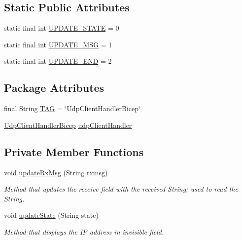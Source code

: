 \subsection*{Static Public Attributes}
\begin{DoxyCompactItemize}
\item 
static final int \mbox{\hyperlink{classcom_1_1example_1_1trainawearapplication_1_1_udp_client_handler_bicep_aac92af19ef7bcdbebc31e78e1822bf61}{U\+P\+D\+A\+T\+E\+\_\+\+S\+T\+A\+TE}} = 0
\item 
static final int \mbox{\hyperlink{classcom_1_1example_1_1trainawearapplication_1_1_udp_client_handler_bicep_a4b12d585b9f99f7364e4295fd18e494e}{U\+P\+D\+A\+T\+E\+\_\+\+M\+SG}} = 1
\item 
static final int \mbox{\hyperlink{classcom_1_1example_1_1trainawearapplication_1_1_udp_client_handler_bicep_a70806fb9d5d3e9626218321b083d9b36}{U\+P\+D\+A\+T\+E\+\_\+\+E\+ND}} = 2
\end{DoxyCompactItemize}
\subsection*{Package Attributes}
\begin{DoxyCompactItemize}
\item 
final String \mbox{\hyperlink{classcom_1_1example_1_1trainawearapplication_1_1_udp_client_handler_bicep_a0eebcd2513478eb3a56f866eaff07fa2}{T\+AG}} = \char`\"{}Udp\+Client\+Handler\+Bicep\char`\"{}
\item 
\mbox{\hyperlink{classcom_1_1example_1_1trainawearapplication_1_1_udp_client_handler_bicep}{Udp\+Client\+Handler\+Bicep}} \mbox{\hyperlink{classcom_1_1example_1_1trainawearapplication_1_1_udp_client_handler_bicep_ad3a0ed8d7e52b90b68d92d0eb891391b}{udp\+Client\+Handler}}
\end{DoxyCompactItemize}
\subsection*{Private Member Functions}
\begin{DoxyCompactItemize}
\item 
void \mbox{\hyperlink{classcom_1_1example_1_1trainawearapplication_1_1_udp_client_handler_bicep_a1f7d4b7fa7229fe47c39dff0b6dec3a2}{update\+Rx\+Msg}} (String rxmsg)
\begin{DoxyCompactList}\small\item\em Method that updates the receive field with the received String; used to read the String. \end{DoxyCompactList}\item 
void \mbox{\hyperlink{classcom_1_1example_1_1trainawearapplication_1_1_udp_client_handler_bicep_aaf087b8a72f9ea8baf46baca6dc4cdc1}{update\+State}} (String state)
\begin{DoxyCompactList}\small\item\em Method that displays the IP address in invisible field. \end{DoxyCompactList}\end{DoxyCompactItemize}

